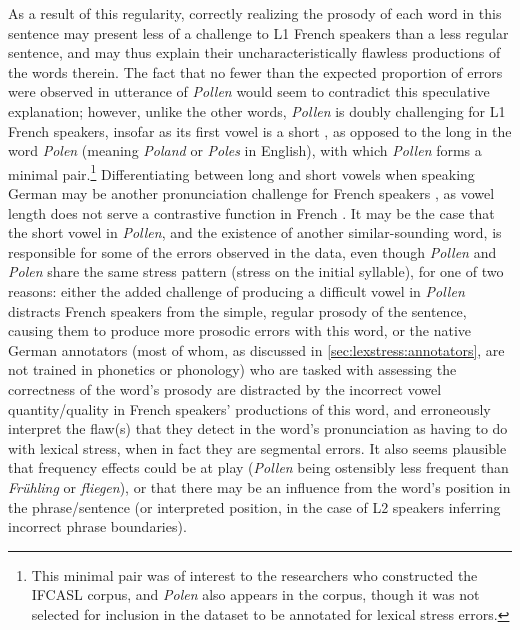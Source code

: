 			As a result of this regularity, correctly realizing the prosody of each word in this sentence may present less of a challenge to L1 French speakers than a less regular sentence, and may thus explain their uncharacteristically flawless productions of the words therein. The fact that no fewer than the expected proportion of errors were observed in utterance of \textit{Pollen} would seem to contradict this speculative explanation; however, unlike the other words, \textit{Pollen} is doubly challenging for L1 French speakers, insofar as its first vowel is a short , as opposed to the long  in the word \textit{Polen} (meaning \textit{Poland} or \textit{Poles} in English), with which \textit{Pollen} forms a minimal pair.\footnote{This minimal pair was of interest to the researchers who constructed the IFCASL corpus, and \textit{Polen} also appears in the corpus, though it was not selected for inclusion in the dataset to be annotated for lexical stress errors.}  Differentiating between long and short vowels when speaking German may be another pronunciation challenge for French speakers , as vowel length does not serve a contrastive function in French \citep{Peperkamp2002}. It may be the case that the short vowel in \textit{Pollen}, and the existence of another similar-sounding word, is responsible for some of the errors observed in the data, even though \textit{Pollen} and \textit{Polen} share the same stress pattern (stress on the initial syllable), for one of two reasons: either the added challenge of producing a difficult vowel in \textit{Pollen} distracts French speakers from the simple, regular prosody of the sentence, causing them to produce more prosodic errors with this word, or the native German annotators (most of whom, as discussed in \cref{sec:lexstress:annotators}, are not trained in phonetics or phonology) who are tasked with assessing the correctness of the word's prosody are distracted by the incorrect vowel quantity/quality in French speakers' productions of this word, and erroneously interpret the flaw(s) that they detect in the word's pronunciation as having to do with lexical stress, when in fact they are segmental errors. 
			It also seems plausible that frequency effects could be at play (\textit{Pollen} being ostensibly less frequent than \textit{Frühling} or \textit{fliegen}), or that there may be an influence from the word's position in the phrase/sentence (or interpreted position, in the case of L2 speakers inferring incorrect phrase boundaries).
			
